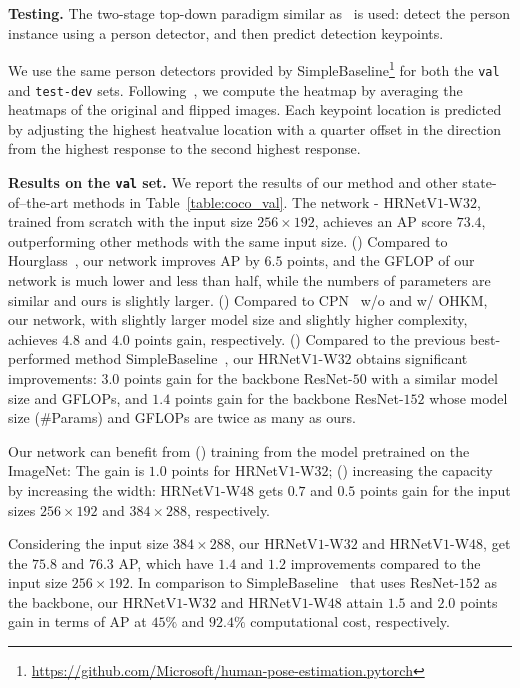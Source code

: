 \documentclass[10pt,journal,compsoc]{IEEEtran}
\begin{document}
\vspace{.1cm}
\noindent\textbf{Testing.}
The two-stage top-down paradigm similar as~\cite{PapandreouZKTTB17,ChenWPZYS17,XiaoWW18}
is used:
detect the person instance using a person detector,
and then predict 
detection keypoints. 

We use the same person detectors provided 
by SimpleBaseline\footnote{\url{https://github.com/Microsoft/human-pose-estimation.pytorch}} for both the \texttt{val}
and \texttt{test-dev} sets. 
Following~\cite{XiaoWW18,NewellYD16,ChenWPZYS17},
we compute the heatmap by averaging the heatmaps of the original and flipped images.
Each keypoint location is predicted
by adjusting the highest heatvalue location with a quarter offset
in the direction from the highest response
to the second highest response. 



	
\vspace{.1cm}
\noindent\textbf{Results on the \texttt{val} set.}
We report the results of our method and other state-of--the-art methods
in Table~\ref{table:coco_val}.
The network - HRNetV$1$-W$32$, trained from scratch
with the input size $256 \times 192$,
achieves an AP score $73.4$,
outperforming other methods 
with the same input size.
() Compared to Hourglass~\cite{NewellYD16},
our network improves AP by $6.5$ points, 
and the GFLOP of our network is much lower and less than half,
while the numbers of parameters are similar 
and ours is slightly larger.
() Compared to CPN~\cite{ChenWPZYS17} w/o and w/ OHKM, our network, with slightly larger model size and slightly higher complexity, achieves $4.8$ and $4.0$ points gain, respectively.
() Compared to the previous best-performed method SimpleBaseline~\cite{XiaoWW18},
our HRNetV$1$-W$32$
obtains significant improvements: $3.0$ points gain for the backbone ResNet-$50$ with a similar model size and GFLOPs, 
and $1.4$ points gain for the backbone ResNet-$152$ whose model size (\#Params) and GFLOPs
are twice as many as ours.

Our network can benefit from 
() training
from the model pretrained on the ImageNet:
The gain is $1.0$ points for HRNetV$1$-W$32$;
() increasing the capacity by increasing the width: HRNetV$1$-W$48$ gets $0.7$ and $0.5$ 
points gain for the input sizes $256\times192$ and $384\times288$, respectively.


Considering the input size $384 \times 288$,
our HRNetV$1$-W$32$ and HRNetV$1$-W$48$,
get the $75.8$ and $76.3$ AP, which have $1.4$ and $1.2$ improvements
compared to the input size $256 \times 192$.
In comparison to SimpleBaseline~\cite{XiaoWW18} that uses ResNet-$152$ as the backbone,
our HRNetV$1$-W$32$ and HRNetV$1$-W$48$ attain $1.5$ and $2.0$ points gain in terms of AP
at $45\%$ and $92.4\%$ computational cost, respectively.
\end{document}
